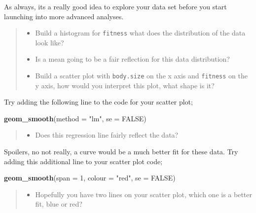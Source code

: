 \documentclass[
]{book}
\newenvironment{Shaded}{\begin{snugshade}}{\end{snugshade}}
\newcommand{\AttributeTok}[1]{\textcolor[rgb]{0.13,0.29,0.53}{#1}}
\newcommand{\ConstantTok}[1]{\textcolor[rgb]{0.56,0.35,0.01}{#1}}
\newcommand{\DecValTok}[1]{\textcolor[rgb]{0.00,0.00,0.81}{#1}}
\newcommand{\FunctionTok}[1]{\textcolor[rgb]{0.13,0.29,0.53}{\textbf{#1}}}
\newcommand{\NormalTok}[1]{#1}
\newcommand{\StringTok}[1]{\textcolor[rgb]{0.31,0.60,0.02}{#1}}
\providecommand{\tightlist}{%
  \setlength{\itemsep}{0pt}\setlength{\parskip}{0pt}}
\begin{document}
As always, its a really good idea to explore your data set before you start launching into more advanced analyses.

\begin{quote}
\begin{itemize}
\tightlist
\item
  Build a histogram for \texttt{fitness} what does the distribution of the data look like?
\item
  Is a mean going to be a fair reflection for this data distribution?
\item
  Build a scatter plot with \texttt{body.size} on the x axis and \texttt{fitness} on the y axis, how would you interpret this plot, what shape is it?
\end{itemize}
\end{quote}

Try adding the following line to the code for your scatter plot;

\begin{Shaded}
\begin{Highlighting}[]
\FunctionTok{geom\_smooth}\NormalTok{(}\AttributeTok{method =} \StringTok{"lm"}\NormalTok{, }\AttributeTok{se =} \ConstantTok{FALSE}\NormalTok{)}
\end{Highlighting}
\end{Shaded}

\begin{quote}
\begin{itemize}
\tightlist
\item
  Does this regression line fairly reflect the data?
\end{itemize}
\end{quote}

Spoilers, no not really, a curve would be a much better fit for these data. Try adding this additional line to your scatter plot code;

\begin{Shaded}
\begin{Highlighting}[]
\FunctionTok{geom\_smooth}\NormalTok{(}\AttributeTok{span =} \DecValTok{1}\NormalTok{, }\AttributeTok{colour =} \StringTok{"red"}\NormalTok{, }\AttributeTok{se =} \ConstantTok{FALSE}\NormalTok{)}
\end{Highlighting}
\end{Shaded}

\begin{quote}
\begin{itemize}
\tightlist
\item
  Hopefully you have two lines on your scatter plot, which one is a better fit, blue or red?
\end{itemize}
\end{quote}
\end{document}
